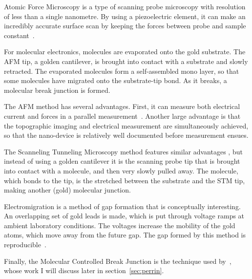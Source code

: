 Atomic Force Microscopy is a type of scanning probe microscopy with resolution of less than a single nanometre. By using a piezoelectric element, it can make an incredibly accurate surface scan by keeping the forces between probe and sample constant~\cite{frei1, frei2}.

For molecular electronics, molecules are evaporated onto the gold substrate. The AFM tip, a golden cantilever, is brought into contact with a substrate and slowly retracted. The evaporated molecules form a self-assembled mono layer, so that some molecules have migrated onto the substrate-tip bond. As it breaks, a molecular break junction is formed.

The AFM method has several advantages. First, it can measure both electrical current and forces in a parallel measurement~\cite{nef}. Another large advantage is that the topographic imaging and electrical measurement are simultaneously achieved, so that the nano-device is relatively well documented before measurement ensues.

The Scanneling Tunneling Microscopy method features similar advantages \cite{Joachim2000}, but instead of using a golden cantilever it is the scanning probe tip that is brought into contact with a molecule, and then very slowly pulled away. The molecule, which bonds to the tip, is the stretched between the substrate and the STM tip, making another (gold) molecular junction.

Electromigration is a method of gap formation that is conceptually interesting. An overlapping set of gold leads is made, which is put through voltage ramps at ambient laboratory conditions. The voltages increase the mobility of the gold atoms, which move away from the future gap. The gap formed by this method is reproducible~\cite{electromigration}.

Finally, the Molecular Controlled Break Junction is the technique used by~\citet{perrinnano}, whose work I will discuss later in section~\ref{sec:perrin}. 

